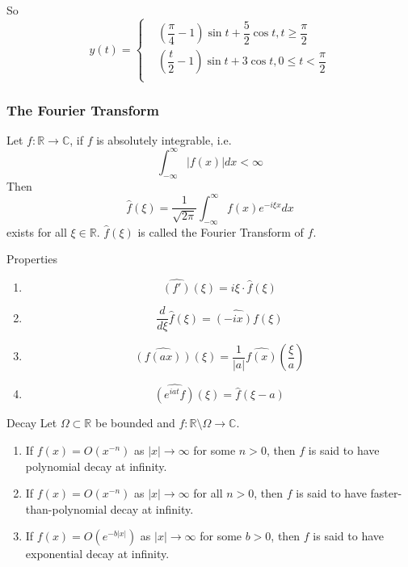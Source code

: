 \documentclass{beamer}
\begin{document}
\begin{frame}
\begin{block}{}
So 
$$y(t)=\left\{
\begin{aligned}
&(\dfrac{\pi}{4}-1)\sin t+\dfrac{5}{2}\cos t,t\geqslant \dfrac{\pi}{2}\\
&(\dfrac{t}{2}-1)\sin t+3\cos t,0\leqslant t<\dfrac{\pi}{2}\\
\end{aligned}
\right.
$$
\end{block}
\end{frame}

\begin{frame}
\frametitle{The Fourier Transform}
\begin{block}{}
Let $f:\mathbb{R}\rightarrow\mathbb{C}$, if $f$ is absolutely integrable, i.e.
$$\int_{-\infty}^{\infty}|f(x)|dx<\infty$$ 
Then
$$\widehat{f}(\xi)=\dfrac{1}{\sqrt{2\pi}}\int_{-\infty}^{\infty}f(x)e^{-i\xi x}dx$$
exists for all $\xi\in\mathbb{R}$. $\widehat{f}(\xi)$ is called the Fourier Transform of $f$.

\end{block}
\end{frame}


\begin{frame}
\begin{block}{Properties}
\begin{enumerate}
\item $$\widehat{(f')}(\xi)=i\xi\cdot\widehat{f}(\xi)$$
\item $$\dfrac{d}{d\xi}\widehat{f}(\xi)=\widehat{(-ix)f}(\xi)$$
\item 
$$\widehat{(f(ax))}(\xi)=\dfrac{1}{|a|}\widehat{f(x)}(\dfrac{\xi}{a})$$
\item
$$\widehat{(e^{iat}f)}(\xi)=\widehat{f}(\xi-a)$$ 
\end{enumerate}

\end{block}
\end{frame}

\begin{frame}
\begin{block}{Decay}
Let $\Omega \subset \mathbb{R}$ be bounded and $f : \mathbb{R}\setminus \Omega
\rightarrow \mathbb{C}$.
\begin{enumerate}

\item  If $ f (x) = O(x^{-n})$ as $|x|\rightarrow\infty$  for some $n > 0$, then $f$ is said to have polynomial decay at infinity.
\item  If $ f (x) = O(x^{-n})$ as $|x|\rightarrow\infty$ for all $n > 0$, then $f$ is said to have faster-than-polynomial decay at infinity.
\item  If $ f (x) = O(e^{-b|x|})$ as $|x|\rightarrow\infty$ for some $b > 0$, then $f$ is said to have exponential decay at infinity.
\end{enumerate}
\end{block}
\end{frame}
\end{document}
